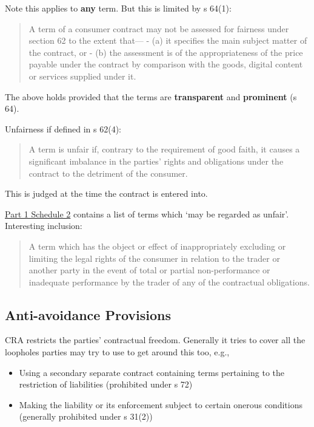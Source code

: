 \documentclass[
]{article}
\providecommand{\tightlist}{%
  \setlength{\itemsep}{0pt}\setlength{\parskip}{0pt}}
\begin{document}
Note this applies to \textbf{any} term. But this is limited by s 64(1):

\begin{quote}
A term of a consumer contract may not be assessed for fairness under
section 62 to the extent that--- - (a) it specifies the main subject
matter of the contract, or - (b) the assessment is of the
appropriateness of the price payable under the contract by comparison
with the goods, digital content or services supplied under it.
\end{quote}

The above holds provided that the terms are \textbf{transparent} and
\textbf{prominent} (s 64).

Unfairness if defined in s 62(4):

\begin{quote}
A term is unfair if, contrary to the requirement of good faith, it
causes a significant imbalance in the parties' rights and obligations
under the contract to the detriment of the consumer.
\end{quote}

This is judged at the time the contract is entered into.

\href{https://www.legislation.gov.uk/ukpga/2015/15/schedule/2/enacted}{Part
1 Schedule 2} contains a list of terms which `may be regarded as
unfair'. Interesting inclusion:

\begin{quote}
A term which has the object or effect of inappropriately excluding or
limiting the legal rights of the consumer in relation to the trader or
another party in the event of total or partial non-performance or
inadequate performance by the trader of any of the contractual
obligations.
\end{quote}

\hypertarget{anti-avoidance-provisions}{%
\subsection{Anti-avoidance Provisions}\label{anti-avoidance-provisions}}

CRA restricts the parties' contractual freedom. Generally it tries to
cover all the loopholes parties may try to use to get around this too,
e.g.,

\begin{itemize}
\tightlist
\item
  Using a secondary separate contract containing terms pertaining to the
  restriction of liabilities (prohibited under s 72)
\item
  Making the liability or its enforcement subject to certain onerous
  conditions (generally prohibited under s 31(2))
\end{itemize}
\end{document}
